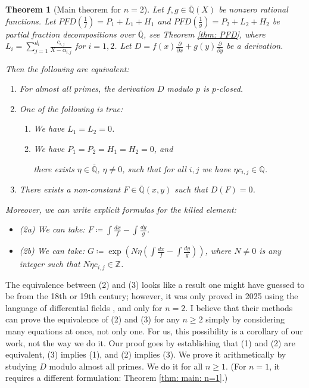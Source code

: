\documentclass{amsart}
\newcommand{\op}{\operatorname}
\newtheorem{thm}{Theorem}[section]
\theoremstyle{definition}
\begin{document}
\begin{thm}[Main theorem for $n=2$]\label{thm: main thm in intro}
    Let $f,g\in \overline{\mathbb{Q}}(X)$ be nonzero rational functions.
    Let $PFD(\frac{1}{f})=P_1+L_1+H_1$ and $PFD(\frac{1}{g})=P_2+L_2+H_2$ be partial fraction decompositions over $\overline{\mathbb{Q}}$, see Theorem \ref{thm: PFD}, where $L_i=\sum_{j=1}^{d_i}\frac{c_{i,j}}{X-\alpha_{i,j}}$ for $i=1,2$.
    Let $D=f(x)\frac{\partial}{\partial x}+g(y)\frac{\partial}{\partial y}$ be a derivation.


    Then the following are equivalent:
    \begin{enumerate}
        \item For almost all primes, the derivation $D$ modulo $p$ is $p$-closed.
        \item One of the following is true:
    \begin{enumerate}
        \item We have $L_1=L_2=0$.
        \item We have $P_1=P_2=H_1=H_2=0$, and 
        
        there exists $\eta\in \overline{\mathbb{Q}}$, $\eta\ne 0$, such that for all $i,j$ we have $\eta c_{i,j}\in {\mathbb{Q}}$.
    \end{enumerate}
        \item There exists a non-constant $F\in \overline{\mathbb{Q}}(x,y)$ such that $D(F)=0$.
    \end{enumerate}
    Moreover, we can write explicit formulas for the killed element:
    \begin{itemize}
        \item (2a) We can take: $F\coloneqq \int \frac{dx}{f}-\int \frac{dy}{g}$.
        \item (2b) We can take: $G \coloneqq \op{exp}\left(N\eta \left(\int \frac{dx}{f}-\int \frac{dy}{g}\right)\right)$, where $N\ne 0$ is any integer such that $N\eta c_{i,j}\in \mathbb{Z}$.
    \end{itemize}
\end{thm}



The equivalence between (2) and (3) looks like a result one might have guessed to be from the 18th or 19th century; however, it was only proved in 2025 using the language of differential fields \cite{rational_first_for_separated_2025}, and only for $n=2$. I believe that their methods can prove the equivalence of (2) and (3) for any $n\ge 2$ simply by considering many equations at once, not only one. For us, this possibility is a corollary of our work, not the way we do it. 
Our proof goes by establishing that (1) and (2) are equivalent, (3) implies (1), and (2) implies (3). We prove it arithmetically by studying $D$ modulo almost all primes. We do it for all $n\ge 1$. (For $n=1$, it requires a different formulation: Theorem \ref{thm: main: n=1}.)
\end{document}
